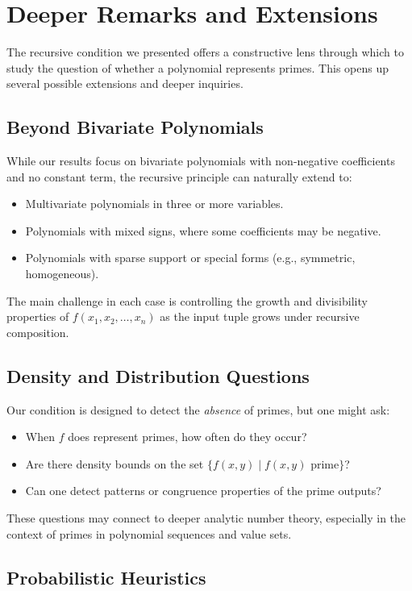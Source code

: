\documentclass[a4paper,11pt]{article}
\begin{document}
	\section{Deeper Remarks and Extensions}
	
	The recursive condition we presented offers a constructive lens through which to study the question of whether a polynomial represents primes. This opens up several possible extensions and deeper inquiries.
	
	\subsection*{Beyond Bivariate Polynomials}
	
	While our results focus on bivariate polynomials with non-negative coefficients and no constant term, the recursive principle can naturally extend to:
	\begin{itemize}
		\item Multivariate polynomials in three or more variables.
		\item Polynomials with mixed signs, where some coefficients may be negative.
		\item Polynomials with sparse support or special forms (e.g., symmetric, homogeneous).
	\end{itemize}
	The main challenge in each case is controlling the growth and divisibility properties of $f(x_1, x_2, \dots, x_n)$ as the input tuple grows under recursive composition.
	
	\subsection*{Density and Distribution Questions}
	
	Our condition is designed to detect the \emph{absence} of primes, but one might ask:
	\begin{itemize}
		\item When $f$ does represent primes, how often do they occur?
		\item Are there density bounds on the set $\{ f(x,y) \mid f(x,y) \text{ prime} \}$?
		\item Can one detect patterns or congruence properties of the prime outputs?
	\end{itemize}
	These questions may connect to deeper analytic number theory, especially in the context of primes in polynomial sequences and value sets.
	
	\subsection*{Probabilistic Heuristics}
	
\end{document}
